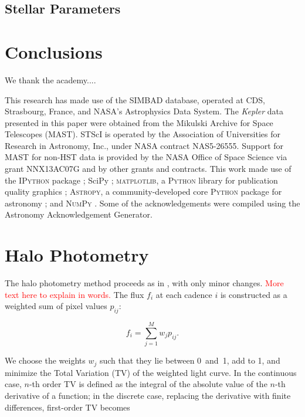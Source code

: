 \documentclass[modern]{aastex61}
\newcommand{\kepler}{\emph{Kepler}\xspace}
\begin{document}
\subsection{Stellar Parameters}

\section{Conclusions}

\acknowledgments

We thank the academy....

This research has made use of the SIMBAD database, operated at CDS, Strasbourg, France, and NASA's Astrophysics Data System. The \kepler data presented in this paper were obtained from the Mikulski Archive for Space Telescopes (MAST). STScI is operated by the Association of Universities for Research in Astronomy, Inc., under NASA contract NAS5-26555. Support for MAST for non-HST data is provided by the NASA Office of Space Science via grant NNX13AC07G and by other grants and contracts.  This work made use of the \textsc{IPython} package \citep{PER-GRA:2007}; SciPy \citep{jones_scipy_2001};  \textsc{matplotlib}, a \textsc{Python} library for publication quality graphics \citep{Hunter:2007}; \textsc{Astropy}, a community-developed core \textsc{Python} package for astronomy \citep{2013A&A...558A..33A}; and \textsc{NumPy} \citep{van2011numpy}. Some of the acknowledgements were compiled using the Astronomy Acknowledgement Generator.

\appendix

\section{Halo Photometry}
\label{halo}

The halo photometry method proceeds as in \citet{White2017}, with only minor changes. \textcolor{red}{More text here to explain in words.}
The flux $f_i$ at each cadence $i$ is constructed as a weighted sum of pixel values $p_{ij}$:

\begin{equation}
	f_i = \sum_{j=1}^{M} w_j p_{ij}.
\end{equation}

\noindent We choose the weights $w_j$ such that they lie between 0~and~1, add to 1, and minimize the Total Variation (TV) of the weighted light curve. In the continuous case, $n$-th order TV is defined as the integral of the absolute value of the $n$-th derivative of a function; in the discrete case, replacing the derivative with finite differences, first-order TV becomes
\end{document}
